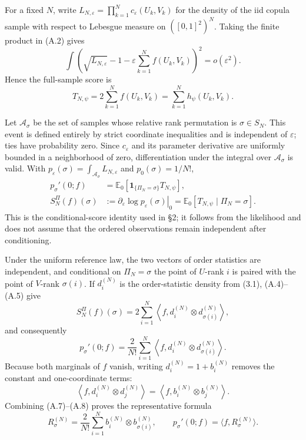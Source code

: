 \documentclass[11pt]{article}
\begin{document}
For a fixed \(N\), write \(L_{N,\varepsilon}=\prod_{k=1}^Nc_\varepsilon(U_k,V_k)\) for the density of the iid copula sample with respect to Lebesgue measure on \(([0,1]^2)^N\). Taking the finite product in (A.2) gives \[ \int \left( \sqrt{L_{N,\varepsilon}}-1 -\varepsilon\sum_{k=1}^Nf(U_k,V_k) \right)^2=o(\varepsilon^2). \tag{A.3} \] Hence the full-sample score is \[ T_{N,\psi} =2\sum_{k=1}^Nf(U_k,V_k) =\sum_{k=1}^Nh_\psi(U_k,V_k). \tag{A.4} \]

Let \(\mathcal A_\sigma\) be the set of samples whose relative rank permutation is \(\sigma\in S_N\). This event is defined entirely by strict coordinate inequalities and is independent of \(\varepsilon\); ties have probability zero. Since \(c_\varepsilon\) and its parameter derivative are uniformly bounded in a neighborhood of zero, differentiation under the integral over \(\mathcal A_\sigma\) is valid. With \(p_\varepsilon(\sigma)=\int_{\mathcal A_\sigma}L_{N,\varepsilon}\) and \(p_0(\sigma)=1/N!\), \[ \begin{aligned} p_\sigma'(0;f) &=\mathbb E_0\!\left[ \mathbf1_{\{\Pi_N=\sigma\}}T_{N,\psi} \right],\\ S_N^\Pi(f)(\sigma) &:=\left.\partial_\varepsilon \log p_\varepsilon(\sigma)\right|_0 =\mathbb E_0[T_{N,\psi}\mid\Pi_N=\sigma]. \end{aligned} \tag{A.5} \] This is the conditional-score identity used in \S2; it follows from the likelihood and does not assume that the ordered observations remain independent after conditioning.

Under the uniform reference law, the two vectors of order statistics are independent, and conditional on \(\Pi_N=\sigma\) the point of \(U\)-rank \(i\) is paired with the point of \(V\)-rank \(\sigma(i)\). If \(d_i^{(N)}\) is the order-statistic density from (3.1), (A.4)--(A.5) give \[ S_N^\Pi(f)(\sigma) =2\sum_{i=1}^N \left\langle f, d_i^{(N)}\otimes d_{\sigma(i)}^{(N)}\right\rangle, \tag{A.6} \] and consequently \[ p_\sigma'(0;f) =\frac2{N!}\sum_{i=1}^N \left\langle f, d_i^{(N)}\otimes d_{\sigma(i)}^{(N)}\right\rangle. \tag{A.7} \] Because both marginals of \(f\) vanish, writing \(d_i^{(N)}=1+b_i^{(N)}\) removes the constant and one-coordinate terms: \[ \left\langle f,d_i^{(N)}\otimes d_j^{(N)}\right\rangle =\left\langle f,b_i^{(N)}\otimes b_j^{(N)}\right\rangle. \tag{A.8} \] Combining (A.7)--(A.8) proves the representative formula \[ R_\sigma^{(N)} =\frac2{N!}\sum_{i=1}^N b_i^{(N)}\otimes b_{\sigma(i)}^{(N)}, \qquad p_\sigma'(0;f)=\langle f,R_\sigma^{(N)}\rangle. \tag{A.9} \]
\end{document}
